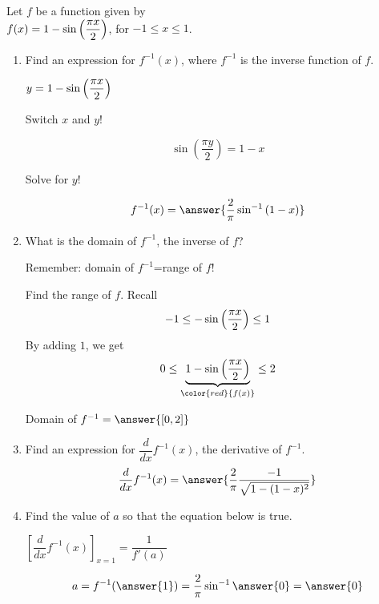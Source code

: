\documentclass{ximera}
\author{Nela Lakos}
\begin{document}
\begin{exercise}

 Let $f$ be a function given by\\[1em]
 $f(x)=1-\sin{\Bigl(\dfrac{\pi x}{2}\Bigr)}$, for $-1\le x \le1$.\\[1em]
 
\begin{enumerate}

\item Find an expression for $f^{-1}(x)$, where $f^{-1}$ is the inverse function of $f$.

\begin{hint}
\(y=1-\sin{\Bigl(\dfrac{\pi x}{2}\Bigr)}\)


Switch $x$ and $y$!
\end{hint}
\begin{hint}
\[
 \sin{\left(\dfrac{\pi y}{2}\right)}=1-x
 \]

Solve for $y$!

\end{hint}


\[
f^{-1}(x)=\answer{\dfrac{2}{\pi }\sin^{-1}{\left(1-x\right)}}
\]


\item What is the domain of $f^{-1}$, the inverse of $f$?

\begin{hint}
Remember: domain of $f^{-1}$=range of $f$!
\end{hint} 
 \begin{hint}
 Find the range of $f$. Recall
 \[
 -1\le -\sin{\Bigl(\dfrac{\pi x}{2}\Bigr)}\le1
 \]
 By adding $1$, we get 
\[
0\le\underbrace{1-\sin{\Bigl(\dfrac{\pi x}{2}\Bigr)}}_{\color{red}{f(x)}}\le2
\]

\end{hint}
Domain of $f^{-1}=\answer{[0,2]}$\\

\item  Find an expression for $\dfrac{d}{dx}f^{-1}(x)$, the derivative of $f^{-1}$.\\

	   \[
	   \dfrac{d}{dx}f^{-1}(x)=\answer{\dfrac{2}{\pi }\dfrac{-1}{\sqrt{1-(1-x)^2}}}
	   \]
	  	   \item   Find the value of $a$ so that the equation below is true.
		   
		   
		   
	    $\left[\dfrac{d}{dx}f^{-1}(x)\right]_{x=1}=\dfrac{1}{f'(a)}$
	    
	    
	    
	
	    \[
	    a=f^{-1}(\answer{1})=\dfrac{2}{\pi }\sin^{-1}{\answer{0}}=\answer{0}
	    \]
	   		
\end{enumerate}
\end{exercise}
\end{document}
